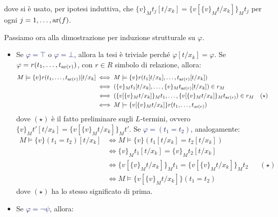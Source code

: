 \begin{soln}
\begin{itemize}
            dove si è usato, per ipotesi induttiva, che $\{v\}_M t_j[t/x_k] = \{v[\{v\}_M t/x_k]\}_M t_j$ per ogni $j = 1,\ldots,\operatorname{ar}(f)$.
    \end{itemize}
    Passiamo ora alla dimostrazione per induzione strutturale su $\varphi$.
    \begin{itemize}
        \item[$\boxed{\text{$L$-formule atomiche}}$] Se \textcolor{MidnightBlue}{$\varphi = \top$} o \textcolor{MidnightBlue}{$\varphi = \bot$}, allora la tesi è triviale perché $\varphi[t/x_k] = \varphi$. Se \textcolor{MidnightBlue}{$\varphi = r(t_1,\ldots,t_{\operatorname{ar}(r)})$}, con $r \in R$ simbolo di relazione, allora:
            \begin{align*}
                M \models\{v\} r(t_1,\ldots,t_{\operatorname{ar}(r)})[t/x_k] & \iff M \models\{v\} r(t_1[t/x_k],\ldots,t_{\operatorname{ar}(r)}[t/x_k]) \\
                                                        & \iff (\{v\}_M t_1[t/x_k],\ldots,\{v\}_M t_{\operatorname{ar}(r)}[t/x_k]) \in r_M \\
                                                        & \iff (\{v[\{v\}_M t/x_k]\}_M t_1,\ldots,\{v[\{v\}_M t/x_k]\}_M t_{\operatorname{ar}(r)}) \in r_M &&(\star) \\
                                                        & \iff M \models\{v[\{v\}_M t/x_k]\} r(t_1,\ldots,t_{\operatorname{ar}(r)})
            \end{align*}
            dove $(\star)$ è il fatto preliminare sugli $L$-termini, ovvero $\{v\}_M t'[t/x_k] = \{v[\{v\}_M t/x_k]\}_M t'$. Se \textcolor{MidnightBlue}{$\varphi = (t_1 = t_2)$}, analogamente:
            \begin{align*}
                M \models\{v\} (t_1 = t_2)[t/x_k] & \iff M \models\{v\} (t_1[t/x_k] = t_2[t/x_k]) \\
                                                  & \iff \{v\}_M t_1[t/x_k] = \{v\}_M t_2[t/x_k] \\
                                                  & \iff \{v[\{v\}_M t/x_k]\}_M t_1 = \{v[\{v\}_M t/x_k]\}_M t_2 &&(\star)\\
                                                  & \iff M \models\{v[\{v\}_M t/x_k]\} (t_1 = t_2)
            \end{align*}
            dove $(\star)$ ha lo stesso significato di prima.
        \item [$\boxed{\text{$L$-formule}}$] Se \textcolor{MidnightBlue}{$\varphi = \neg \psi$}, allora:
            \begin{align*}

\end{align*}
\end{itemize}
\end{soln}
